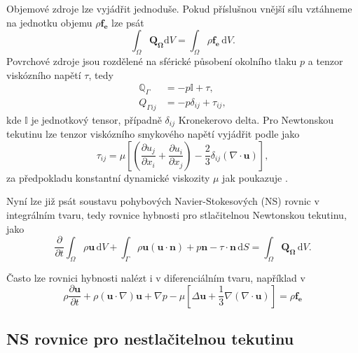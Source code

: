 Objemové zdroje lze vyjádřit jednoduše. Pokud příslušnou vnější sílu vztáhneme na jednotku objemu $\rho \mathbf{f_e}$ lze psát
\begin{equation*}
\int_{\Omega} \mathbf{Q_\Omega} \mathrm{d}V = \int_{\Omega} \rho \mathbf{f_e} \,\mathrm{d}V.
\end{equation*}
Povrchové zdroje jsou rozdělené na sférické působení okolního tlaku $p$ a tenzor viskózního napětí $\tau$, tedy
\begin{align*}
\mathbb{Q}_\Gamma &= -p \mathbb{I}+\tau, \\
Q_{\Gamma ij}&= -p \delta_{ij}+\tau_{ij},
\end{align*}
kde $\mathbb{I}$ je jednotkový tensor, případně $\delta_{ij}$ Kronekerovo delta. Pro Newtonskou tekutinu lze tenzor viskózního smykového napětí vyjádřit podle \cite{hirsch2007numerical} jako 
\begin{equation*}
\tau_{ij}=\mu \left[ \left( \dfrac{\partial u_j}{\partial x_i} + \dfrac{\partial u_i}{\partial x_j} \right) - \dfrac{2}{3} \delta_{ij} \left(\nabla \cdot \mathbf{u}\right)  \right],
\end{equation*}
za předpokladu konstantní dynamické viskozity $\mu$ jak poukazuje \cite{dvorak1987vnitrniaerodynamika}.

Nyní lze již psát soustavu pohybových Navier-Stokesových (NS) rovnic v integrálním tvaru, tedy rovnice hybnosti pro stlačitelnou Newtonskou tekutinu, jako
\begin{equation*}
\dfrac{\partial}{\partial t} \int_{\Omega} \rho \mathbf{u} \,\mathrm{d}V + \int_{\Gamma} \rho \mathbf{u} (\mathbf{u}\cdot \mathbf{n}) + p\mathbf{n} - \tau \cdot \mathbf{n} \,\mathrm{d}S = \int_\Omega \mathbf{Q_\Omega} \,\mathrm{d}V.
\end{equation*}

Často lze rovnici hybnosti nalézt i v diferenciálním tvaru, například v \cite{hirsch2007numerical}
\begin{equation*}
\rho \dfrac{\partial \mathbf{u}}{\partial t} + \rho (\mathbf{u} \cdot \nabla)\mathbf{u} +\nabla p - \mu \left[ \Delta \mathbf{u} + \dfrac{1}{3} \nabla(\nabla \cdot \mathbf{u}) \right] = \rho \mathbf{f_e}
\end{equation*}

\subsection{NS rovnice pro nestlačitelnou tekutinu}

